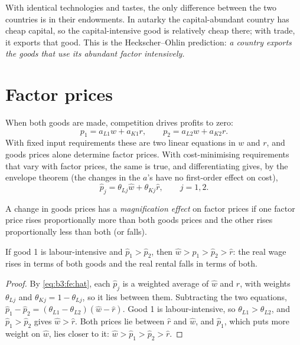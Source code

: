 With identical technologies and tastes, the only difference between the two
countries is in their endowments. In autarky the capital-abundant country has
cheap capital, so the capital-intensive good is relatively cheap there; with
trade, it exports that good. This is the Heckscher--Ohlin prediction: \emph{a
country exports the goods that use its abundant factor intensively.}

\section{Factor prices}\label{sec:b3:factor-endowments:prices}

When both goods are made, competition drives profits to zero:
\begin{equation}\label{eq:b3:fe:zp}
  p_1 = a_{L1} w + a_{K1} r, \qquad p_2 = a_{L2} w + a_{K2} r .
\end{equation}
With fixed input requirements these are two linear equations in $w$ and $r$, and
goods prices alone determine factor prices. With cost-minimising requirements
that vary with factor prices, the same is true, and differentiating gives, by
the envelope theorem (the changes in the $a$'s have no first-order effect on
cost),
\begin{equation}\label{eq:b3:fe:hat}
  \hat p_j = \theta_{Lj}\hat w + \theta_{Kj}\hat r, \qquad j = 1, 2 .
\end{equation}

\begin{definition}\label{def:b3:factor-endowments:magnification}
A change in goods prices has a \emph{magnification effect} on factor prices if
one factor price rises proportionally more than both goods prices and the other
rises proportionally less than both (or falls).
\end{definition}

\begin{proposition}\label{prop:b3:factor-endowments:ss}
If good 1 is labour-intensive and $\hat p_1 > \hat p_2$, then $\hat w > \hat p_1 > \hat p_2 >
\hat r$: the real wage rises in terms of both goods and the real rental falls in
terms of both.
\end{proposition}

\begin{proof}
By \eqref{eq:b3:fe:hat}, each $\hat p_j$ is a weighted average of $\hat w$ and $\hat r$,
with weights $\theta_{Lj}$ and $\theta_{Kj} = 1 - \theta_{Lj}$, so it lies between them.
Subtracting the two equations, $\hat p_1 - \hat p_2 = (\theta_{L1} - \theta_{L2})(\hat w -
\hat r)$. Good 1 is labour-intensive, so $\theta_{L1} > \theta_{L2}$, and $\hat p_1 > \hat p_2$
gives $\hat w > \hat r$. Both prices lie between $\hat r$ and $\hat w$, and $\hat p_1$, which
puts more weight on $\hat w$, lies closer to it: $\hat w > \hat p_1 > \hat p_2 > \hat r$.
\end{proof}

